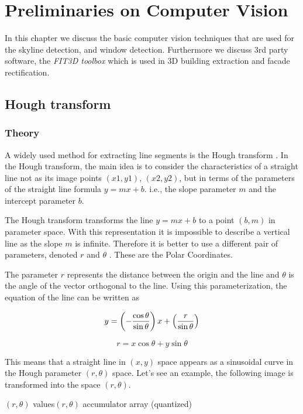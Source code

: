 \section{Preliminaries on Computer Vision}
In this chapter we discuss the basic computer vision techniques that are used for
the skyline detection, and window detection.  Furthermore we discuss 3rd
party software, the \emph{FIT3D toolbox} \cite{Fit3d} which is used in 3D building extraction and facade rectification.

\subsection{Hough transform}
\label{sec:prelimHough}
\subsubsection{Theory}
	A widely used method for extracting line segments is the Hough transform
	\cite{Hough}.
	In the Hough transform, the main idea is to consider the characteristics of a
	straight line not as its image points $(x1, y1)$, $(x2, y2)$, but in
	terms of the parameters of the straight line formula $y = mx + b$. i.e., the
	slope parameter $m$ and the intercept parameter $b$.


	The Hough transform transforms the line $y = mx + b$ 
	to a point $(b,m)$ in parameter space.
	With this representation it is impossible to describe a vertical line as 
	the slope $m$ is infinite.
	Therefore it is better to use a different pair of parameters, denoted $r$ and $\theta$ .  These are the Polar Coordinates.

	The parameter $r$ represents the distance between the origin and the line  and $\theta$ is the angle of the vector orthogonal to the line.
	Using this parameterization, the equation of the line can be written as

\[	    y = \left(-{\cos\theta\over\sin\theta}\right)x + \left({r\over{\sin\theta}}\right) \]

	\[r = x \cos \theta+y\sin \theta \]
	
	This means that a straight line in $(x,y)$ space appears as a sinusoidal
	curve in the Hough parameter $(r,\theta)$ space.  Let's see an example, the
	following image is transformed into the space $(r,\theta)$.
	
	 {$(r, \theta)$ values}{$(r, \theta)$ accumulator array (quantized)}

